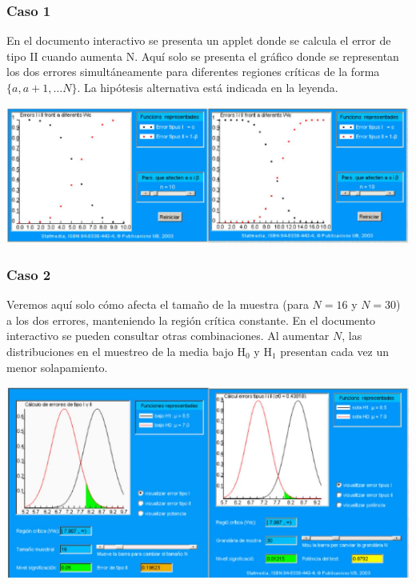 \documentclass[
]{article}
\begin{document}
\subsubsection{Caso 1}\label{caso-1}

En el documento interactivo se presenta un applet donde se calcula el error de tipo II cuando aumenta N. Aquí solo se presenta el gráfico donde se representan los dos errores simultáneamente para diferentes regiones críticas de la forma \(\{a, a+1, \ldots N\}\). La hipótesis alternativa está indicada en la leyenda.

\begin{center}\includegraphics[width=0.9\linewidth]{images/cap9-SampleSizeEffect-1} \end{center}

\subsubsection{Caso 2}\label{caso-2}

Veremos aquí solo cómo afecta el tamaño de la muestra (para \(N=16\) y \(N=30\)) a los dos errores, manteniendo la región crítica constante. En el documento interactivo se pueden consultar otras combinaciones. Al aumentar \(N\), las distribuciones en el muestreo de la media bajo \(\mathrm{H}_{0}\) y \(\mathrm{H}_{1}\) presentan cada vez un menor solapamiento.

\begin{center}\includegraphics[width=0.9\linewidth]{images/cap9-SampleSizeEffect-2} \end{center}
\end{document}

